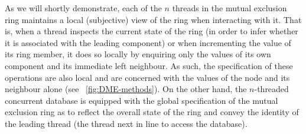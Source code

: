 As we will shortly demonstrate, each of the $n$ threads in the mutual exclusion ring maintains a local (subjective) view of the ring when interacting with it. That is, when a thread inspects the current state of the ring (in order to infer whether it is associated with the leading component) or when incrementing the value of its ring member, it does so locally by enquiring only the values of its own component and its immediate left neighbour. As such, the specification of these operations are also local and are concerned with the values of the node and its neighbour alone (see \fig~\ref{fig:DME-methods}). On the other hand, the $n$-threaded concurrent database is equipped with the global specification of the mutual exclusion ring as to reflect the overall state of the ring and convey the identity of the leading thread (the thread next in line to access the database).
%
